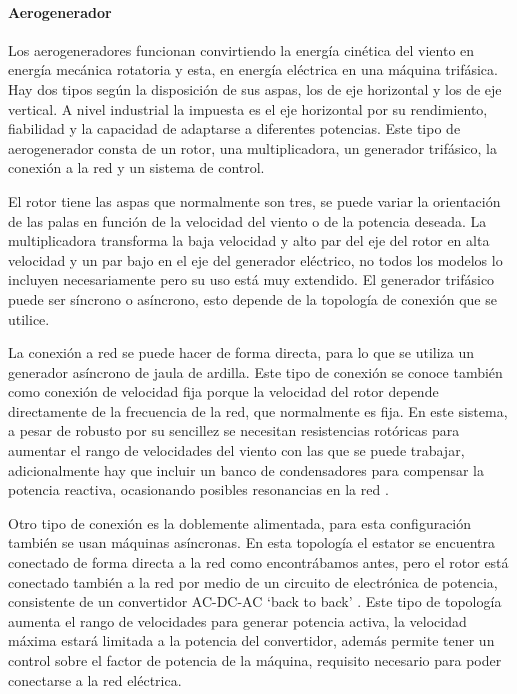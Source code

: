 \documentclass{book}
\begin{document}
		\paragraph{Aerogenerador}
		Los aerogeneradores funcionan convirtiendo la energ\'ia cin\'etica del viento en energ\'ia mec\'anica rotatoria y esta, en energ\'ia el\'ectrica en una m\'aquina trif\'asica. Hay dos tipos seg\'un la disposici\'on de sus aspas, los de eje horizontal y los de eje vertical. A nivel industrial la impuesta es el eje horizontal por su rendimiento, fiabilidad y la capacidad de adaptarse a diferentes potencias. Este tipo de aerogenerador consta de un rotor, una multiplicadora, un generador trif\'asico, la conexi\'on a la red y un sistema de control. \par
		El rotor tiene las aspas que normalmente son tres, se puede variar la orientaci\'on de las palas en funci\'on de la velocidad del viento o de la potencia deseada. La multiplicadora transforma la baja velocidad y alto par del eje del rotor en alta velocidad y un par bajo en el eje del generador el\'ectrico, no todos los modelos lo incluyen necesariamente pero su uso est\'a muy extendido. El generador trif\'asico puede ser s\'incrono  o as\'incrono, esto depende de la topolog\'ia de conexi\'on que se utilice.  \par
		La conexi\'on a red se puede hacer de forma directa, para lo que se utiliza un generador as\'incrono de jaula de ardilla. Este tipo de conexi\'on se conoce tambi\'en como conexi\'on de velocidad fija porque la velocidad del rotor depende directamente de la frecuencia de la red, que normalmente es fija. En este sistema, a pesar de robusto por su sencillez se necesitan resistencias rot\'oricas para aumentar el rango de velocidades del viento con las que se puede trabajar, adicionalmente hay que incluir un banco de condensadores para compensar la potencia reactiva, ocasionando posibles resonancias en la red \cite{TopologiasWT}. \par 
		Otro tipo de conexi\'on es la doblemente alimentada, para esta configuraci\'on tambi\'en se usan m\'aquinas as\'incronas. En esta topolog\'ia el estator se encuentra conectado de forma directa a  la red como encontr\'abamos antes, pero el rotor est\'a conectado tambi\'en a la red por medio de un circuito de electr\'onica de potencia, consistente de un convertidor AC-DC-AC ‘back to back’ \cite{AerogeneradorDIFG}. Este tipo de topolog\'ia aumenta el rango de velocidades para generar potencia activa, la velocidad m\'axima estar\'a limitada a la potencia del convertidor, adem\'as permite tener un control sobre el factor de potencia de la m\'aquina, requisito necesario para poder conectarse a la red el\'ectrica. \par
\end{document}
